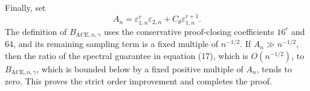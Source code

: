 Finally, set
\[
 A_n=\varepsilon_{1,n}^r\varepsilon_{2,n}
     +C_{\theta}\varepsilon_{1,n}^{r+1}.
\]
The definition of \(B_{\mathrm{ACE},n,\gamma}\) uses the conservative proof-closing coefficients \(16^r\) and \(64\), and its remaining sampling term is a fixed multiple of \(n^{-1/2}\).  If \(A_n\gg n^{-1/2}\), then the ratio of the spectral guarantee in equation (17), which is \(O(n^{-1/2})\), to \(B_{\mathrm{ACE},n,\gamma}\), which is bounded below by a fixed positive multiple of \(A_n\), tends to zero.  This proves the strict order improvement and completes the proof.